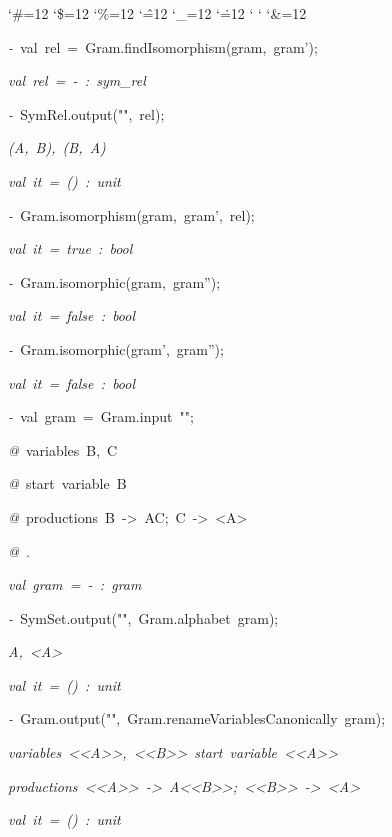 \begin{list}{}
{\setlength{\leftmargin}{\leftmargini}
\setlength{\rightmargin}{0cm}
\setlength{\itemindent}{0cm}
\setlength{\listparindent}{0cm}
\setlength{\itemsep}{0cm}
\setlength{\parsep}{0cm}
\setlength{\labelsep}{0cm}
\setlength{\labelwidth}{0cm}
\catcode`\#=12
\catcode`\$=12
\catcode`\%=12
\catcode`\^=12
\catcode`\_=12
\catcode`\.=12
\catcode`
\catcode`
\catcode`\&=12
\ttfamily}
\small
\item[]\textsl{-\ }val\ rel\ =\ Gram.findIsomorphism(gram,\ gram');
\item[]\textsl{val\ rel\ =\ -\ :\ sym_rel}
\item[]\textsl{-\ }SymRel.output("",\ rel);
\item[]\textsl{(A,\ B),\ (B,\ A)}
\item[]\textsl{val\ it\ =\ ()\ :\ unit}
\item[]\textsl{-\ }Gram.isomorphism(gram,\ gram',\ rel);
\item[]\textsl{val\ it\ =\ true\ :\ bool}
\item[]\textsl{-\ }Gram.isomorphic(gram,\ gram'');
\item[]\textsl{val\ it\ =\ false\ :\ bool}
\item[]\textsl{-\ }Gram.isomorphic(gram',\ gram'');
\item[]\textsl{val\ it\ =\ false\ :\ bool}
\item[]\textsl{-\ }val\ gram\ =\ Gram.input\ "";
\item[]\textsl{@\ }variables\ B,\ C
\item[]\textsl{@\ }start\ variable\ B
\item[]\textsl{@\ }productions\ B\ ->\ AC;\ C\ ->\ <A>
\item[]\textsl{@\ }.
\item[]\textsl{val\ gram\ =\ -\ :\ gram}
\item[]\textsl{-\ }SymSet.output("",\ Gram.alphabet\ gram);
\item[]\textsl{A,\ <A>}
\item[]\textsl{val\ it\ =\ ()\ :\ unit}
\item[]\textsl{-\ }Gram.output("",\ Gram.renameVariablesCanonically\ gram);
\item[]\textsl{variables\ <<A>>,\ <<B>>\ start\ variable\ <<A>>}
\item[]\textsl{productions\ <<A>>\ ->\ A<<B>>;\ <<B>>\ ->\ <A>}
\item[]\textsl{val\ it\ =\ ()\ :\ unit}
\end{list}
